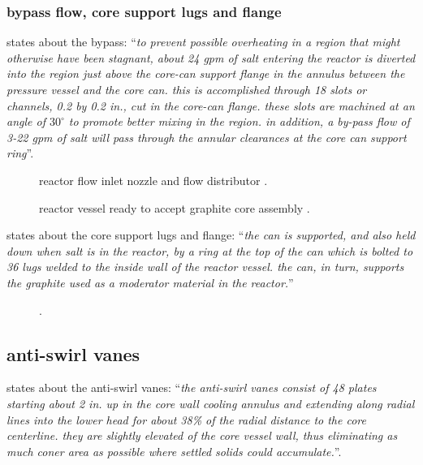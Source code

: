 \documentclass{article}
\newcommand*{\mrsarchive}{../../msr-archive}%
\begin{document}
\subsubsection{bypass flow, core support lugs and flange}
\parencite[page 85]{ornl-tm-0728} states about the bypass:
\enquote{\textit{to prevent possible overheating in a region that might otherwise have been stagnant, about 24 gpm of salt entering the reactor is diverted into the region just above the core-can support flange in the annulus between the pressure vessel and the core can. this is accomplished through 18 slots or channels, 0.2 by 0.2 in., cut in the core-can flange. these slots are machined at an angle of $30^\circ$ to promote better mixing in the region. in addition, a by-pass flow of 3-22 gpm of salt will pass through the annular clearances at the core can support ring}}.

\begin{figure}[H]
  \centering
  \caption{reactor flow inlet nozzle and flow distributor \parencite[figure 38]{ornl-3708}.}
\end{figure}

\begin{figure}[H]
  \centering
  \caption{reactor vessel ready to accept graphite core assembly \parencite[figure 39]{ornl-3708}.}
  \label{3708-fig39}
\end{figure}

\parencite[page 79]{ornl-tm-0728} states about the core support lugs and flange:
\enquote{\textit{the can is supported, and also held down when salt is in the reactor, by a ring at the top of the can which is bolted to 36 lugs welded to the inside wall of the reactor vessel. the can, in turn, supports the graphite used as a moderator material in the reactor.}}

\begin{figure}[H]
  \centering
  \caption{ \parencite[figure 39]{ornl-3626}.}
  \label{3626-fig1-3}
\end{figure}

\subsection{anti-swirl vanes}
\textcite[page 14]{ornl-tm-3229} states about the anti-swirl vanes:
\enquote{\textit{the anti-swirl vanes consist of 48 plates starting about 2 in. up in the core wall cooling annulus and extending along radial lines into the lower head for about 38\% of the radial distance to the core centerline. they are slightly elevated of the core vessel wall, thus eliminating as much coner area as possible where settled solids could accumulate.}}. \\
\end{document}
